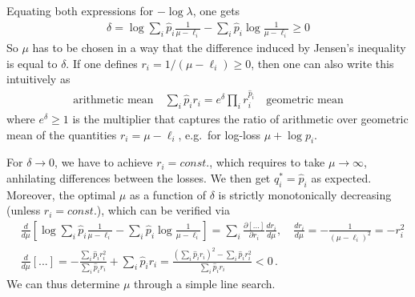 \documentclass{article}
\begin{document}
Equating both expressions for $-\log \lambda$, one gets
\begin{align}
\delta  = \log  \sum_i \hat p_i \frac{1}{\mu - \ell_i} - \sum_i \hat p_i \log \frac{1}{\mu - \ell_i} \ge 0
\end{align}
So $\mu$ has to be chosen in a way that the difference induced by Jensen's inequality is equal to $\delta$. If one defines $r_i = 1/(\mu - \ell_i) \ge 0$, then one can also write this intuitively as
\begin{align}
\text{arithmetic mean} \quad  \sum_i \hat p_i r_i  = e^\delta  \prod_i r_i^{\hat p_i}  \quad \text{geometric mean}
\end{align}
where $e^\delta \ge 1$ is the multiplier that captures the ratio of arithmetic over geometric mean of the quantities $r_i=\mu - \ell_i$, e.g.~for log-loss $\mu + \log p_i$.

For $\delta \to 0$, we have to achieve $r_i = const.$, which requires to take $\mu \to \infty$, anhilating differences between the losses. We then get $q_i^* = \hat p_i$ as expected.  Moreover, the optimal $\mu$ as a function of $\delta$ is strictly monotonically decreasing (unless $r_i = const.$), which can be verified via 
\begin{align}
& \frac{d}{d\mu} \left[  \log  \sum_i \hat p_i \frac{1}{\mu - \ell_i} - \sum_i \hat p_i \log \frac{1}{\mu - \ell_i}  \right] = 
\sum_{i} \frac{\partial [...]}{\partial r_i}  \frac{d r_i}{d\mu} , \quad
 \frac{d r_i}{d\mu} = - \frac{1}{(\mu - \ell_i)^2} = -r_i^2 \\
& \frac{d}{d\mu} \left[ ... \right] = - \frac{\sum_i  \hat p_i r_i^2}{\sum_i \hat p_i r_i} + \sum_i \hat p_i r_i = 
\frac{(\sum_i \hat p_i r_i)^2 - \sum_i \hat p_i r_i^2}{\sum_i \hat p_i r_i} < 0 \,.
\end{align}
We can thus determine $\mu$ through a simple line search. 

\newpage
\end{document}
